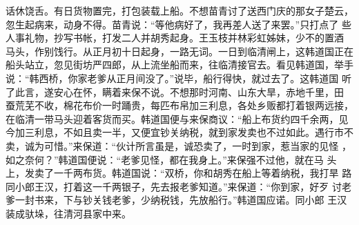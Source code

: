 话休饶舌。有日货物置完，打包装载上船。不想苗青讨了送西门庆的那女子楚云，
忽生起病来，动身不得。苗青说：“等他病好了，我再差人送了来罢。”只打点了
些人事礼物，抄写书帐，打发二人并胡秀起身。王玉枝并林彩虹姊妹，少不的置酒
马头，作别饯行。从正月初十日起身，一路无词。一日到临清闸上，这韩道国正在
船头站立，忽见街坊严四郎，从上流坐船而来，往临清接官去。看见韩道国，举手
说：“韩西桥，你家老爹从正月间没了。”说毕，船行得快，就过去了。这韩道国
听了此言，遂安心在怀，瞒着来保不说。不想那时河南、山东大旱，赤地千里，田
蚕荒芜不收，棉花布价一时踊贵，每匹布帛加三利息，各处乡贩都打着银两远接，
在临清一带马头迎着客货而买。韩道国便与来保商议：“船上布货约四千余两，见
今加三利息，不如且卖一半，又便宜钞关纳税，就到家发卖也不过如此。遇行市不
卖，诚为可惜。”来保道：“伙计所言虽是，诚恐卖了，一时到家，惹当家的见怪
，如之奈何？”韩道国便说：“老爹见怪，都在我身上。”来保强不过他，就在马
头上，发卖了一千两布货。韩道国说：“双桥，你和胡秀在船上等着纳税，我打旱
路同小郎王汉，打着这一千两银子，先去报老爹知道。”来保道：“你到家，好歹
讨老爹一封书来，下与钞关钱老爹，少纳税钱，先放船行。”韩道国应诺。同小郎
王汉装成驮垛，往清河县家中来。

